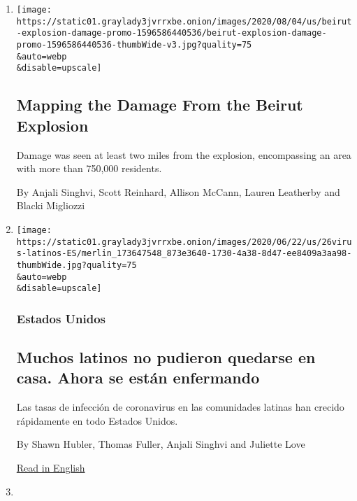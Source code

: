 \begin{enumerate}
\def\labelenumi{\arabic{enumi}.}
\item
  \href{/interactive/2020/08/04/world/middleeast/beirut-explosion-damage.html}{}

  \texttt{[image: https://static01.graylady3jvrrxbe.onion/images/2020/08/04/us/beirut-explosion-damage-promo-1596586440536/beirut-explosion-damage-promo-1596586440536-thumbWide-v3.jpg?quality=75\\\&auto=webp\\\&disable=upscale]}

  \hypertarget{mapping-the-damage-from-the-beirut-explosion}{%
  \subsection{Mapping the Damage From the Beirut
  Explosion}\label{mapping-the-damage-from-the-beirut-explosion}}

  Damage was seen at least two miles from the explosion, encompassing an
  area with more than 750,000 residents.

  By Anjali Singhvi, Scott Reinhard, Allison McCann, Lauren Leatherby
  and Blacki Migliozzi
\item
  \href{/es/2020/06/26/espanol/latinos-coronavirus.html}{}

  \texttt{[image: https://static01.graylady3jvrrxbe.onion/images/2020/06/22/us/26virus-latinos-ES/merlin\_173647548\_873e3640-1730-4a38-8d47-ee8409a3aa98-thumbWide.jpg?quality=75\\\&auto=webp\\\&disable=upscale]}

  \hypertarget{estados-unidos}{%
  \subsubsection{Estados Unidos}\label{estados-unidos}}

  \hypertarget{muchos-latinos-no-pudieron-quedarse-en-casa-ahora-se-estuxe1n-enfermando}{%
  \subsection{Muchos latinos no pudieron quedarse en casa. Ahora se
  están
  enfermando}\label{muchos-latinos-no-pudieron-quedarse-en-casa-ahora-se-estuxe1n-enfermando}}

  Las tasas de infección de coronavirus en las comunidades latinas han
  crecido rápidamente en todo Estados Unidos.

  By Shawn Hubler, Thomas Fuller, Anjali Singhvi and Juliette Love

  \href{https://www.nytimes3xbfgragh.onion/2020/06/26/us/corona-virus-latinos.html}{Read
  in English}
\item
  \href{/2020/06/26/us/corona-virus-latinos.html}{}


\end{enumerate}
